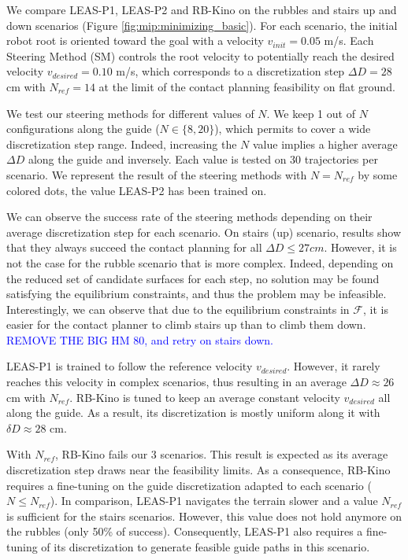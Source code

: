 We compare LEAS-P1, LEAS-P2 and RB-Kino on the rubbles and stairs up and down scenarios (Figure \ref{fig:mip:minimizing_basic}).
For each scenario, the initial robot root is oriented toward the goal with a velocity $v_{init}=0.05$ m/s.
Each Steering Method (SM) controls the root velocity to potentially reach the desired velocity $v_{desired}=0.10$ m/s, which corresponds to a discretization step $\Delta D=28$ cm with $N_{ref}=14$ at the limit of the contact planning feasibility on flat ground.

We test our steering methods for different values of $N$. 
We keep 1 out of $N$ configurations along the guide ($N \in \{8,20\}$), which permits to cover a wide discretization step range.
Indeed, increasing the $N$ value implies a higher average $\Delta D$ along the guide and inversely.
Each value is tested on 30 trajectories per scenario.
We represent the result of the steering methods with $N=N_{ref}$ by some colored dots, the value LEAS-P2 has been trained on.

We can observe the success rate of the steering methods depending on their average discretization step for each scenario.
On stairs (up) scenario, results show that they always succeed the contact planning for all $\Delta D \leq 27 cm$.
However, it is not the case for the rubble scenario that is more complex. Indeed, depending on the reduced set of candidate surfaces for each step, no solution may be found satisfying the equilibrium constraints, and thus the problem may be infeasible.
Interestingly, we can observe that due to the equilibrium constraints in $\mathcal{F}$, it is easier for the contact planner to climb stairs up than to climb them down. \textcolor{blue}{REMOVE THE BIG HM 80, and retry on stairs down.}

LEAS-P1 is trained to follow the reference velocity $v_{desired}$.
However, it rarely reaches this velocity in complex scenarios, thus resulting in an average $\Delta D \approx 26$ cm with $N_{ref}$.
RB-Kino is tuned to keep an average constant velocity $v_{desired}$ all along the guide. As a result, its discretization is mostly uniform along it with $\delta D \approx 28$ cm.

With $N_{ref}$, RB-Kino fails our 3 scenarios. This result is expected as its average discretization step draws near the feasibility limits.
As a consequence, RB-Kino requires a fine-tuning on the guide discretization adapted to each scenario ($N \leq N_{ref}$).
In comparison, LEAS-P1 navigates the terrain slower and a value $N_{ref}$ is sufficient for the stairs scenarios. 
However, this value does not hold anymore on the rubbles (only 50\% of success). 
Consequently, LEAS-P1 also requires a fine-tuning of its discretization to generate feasible guide paths in this scenario.

